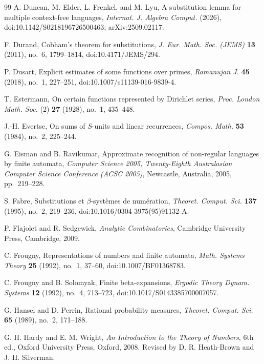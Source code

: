 \begin{thebibliography}{99}
A. Duncan, M. Elder, L. Frenkel, and M. Lyu,
A substitution lemma for multiple context-free languages,
\textit{Internat. J. Algebra Comput.} (2026),
doi:10.1142/S0218196726500463; arXiv:2509.02117.

F. Durand,
Cobham's theorem for substitutions,
\textit{J. Eur. Math. Soc. (JEMS)} \textbf{13} (2011), no.~6,
1799--1814, doi:10.4171/JEMS/294.

P. Dusart,
Explicit estimates of some functions over primes,
\textit{Ramanujan J.} \textbf{45} (2018), no.~1, 227--251,
doi:10.1007/s11139-016-9839-4.

T. Estermann,
On certain functions represented by Dirichlet series,
\textit{Proc. London Math. Soc.} (2) \textbf{27} (1928), no.~1, 435--448.

J.-H. Evertse,
On sums of \(S\)-units and linear recurrences,
\textit{Compos. Math.} \textbf{53} (1984), no.~2, 225--244.

G. Eisman and B. Ravikumar,
Approximate recognition of non-regular languages by finite automata,
\textit{Computer Science 2005, Twenty-Eighth Australasian Computer
Science Conference (ACSC 2005)}, Newcastle, Australia, 2005,
pp.~219--228.

S. Fabre,
Substitutions et \(\beta\)-syst\`emes de num\'eration,
\textit{Theoret. Comput. Sci.} \textbf{137} (1995), no.~2, 219--236,
doi:10.1016/0304-3975(95)91132-A.

P. Flajolet and R. Sedgewick,
\textit{Analytic Combinatorics},
Cambridge University Press, Cambridge, 2009.

C. Frougny,
Representations of numbers and finite automata,
\textit{Math. Systems Theory} \textbf{25} (1992), no.~1, 37--60,
doi:10.1007/BF01368783.

C. Frougny and B. Solomyak,
Finite beta-expansions,
\textit{Ergodic Theory Dynam. Systems} \textbf{12} (1992), no.~4,
713--723,
doi:10.1017/S0143385700007057.

G. Hansel and D. Perrin,
Rational probability measures,
\textit{Theoret. Comput. Sci.} \textbf{65} (1989), no.~2, 171--188.

G. H. Hardy and E. M. Wright,
\textit{An Introduction to the Theory of Numbers},
6th ed., Oxford University Press, Oxford, 2008.
Revised by D. R. Heath-Brown and J. H. Silverman.


\end{thebibliography}
